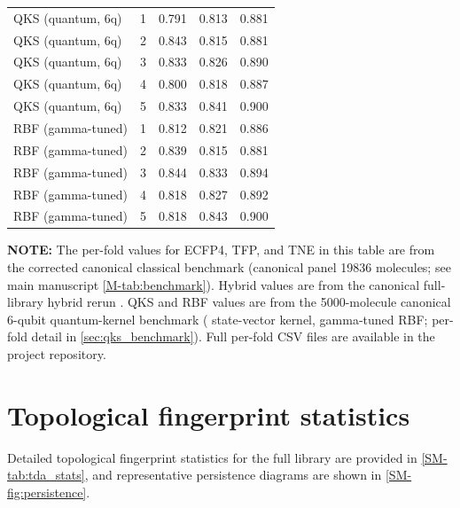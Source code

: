 \documentclass[11pt,a4paper]{article}
\begin{document}
\begin{table}[htbp]
\begin{tabularx}{\textwidth}{l l S[table-format=1.3] S[table-format=1.3] S[table-format=1.3]}
\midrule
QKS (quantum, 6q) & 1 & 0.791 & 0.813 & 0.881 \\
QKS (quantum, 6q) & 2 & 0.843 & 0.815 & 0.881 \\
QKS (quantum, 6q) & 3 & 0.833 & 0.826 & 0.890 \\
QKS (quantum, 6q) & 4 & 0.800 & 0.818 & 0.887 \\
QKS (quantum, 6q) & 5 & 0.833 & 0.841 & 0.900 \\
\midrule
RBF (gamma-tuned) & 1 & 0.812 & 0.821 & 0.886 \\
RBF (gamma-tuned) & 2 & 0.839 & 0.815 & 0.881 \\
RBF (gamma-tuned) & 3 & 0.844 & 0.833 & 0.894 \\
RBF (gamma-tuned) & 4 & 0.818 & 0.827 & 0.892 \\
RBF (gamma-tuned) & 5 & 0.818 & 0.843 & 0.900 \\
\bottomrule
\end{tabularx}
\end{table}

\vspace{2mm}
\noindent\textbf{NOTE:} The per-fold values for ECFP4, TFP, and TNE in this table are from the corrected canonical classical benchmark (canonical panel \num{19836} molecules; see main manuscript \cref{M-tab:benchmark}). Hybrid values are from the canonical full-library hybrid rerun . QKS and RBF values are from the \num{5000}-molecule canonical 6-qubit quantum-kernel benchmark ( state-vector kernel, gamma-tuned RBF; per-fold detail in \cref{sec:qks_benchmark}). Full per-fold CSV files are available in the project repository.

\section{Topological fingerprint statistics}



Detailed topological fingerprint statistics for the full library are provided in \cref{SM-tab:tda_stats}, and representative persistence diagrams are shown in \cref{SM-fig:persistence}.
\end{document}
